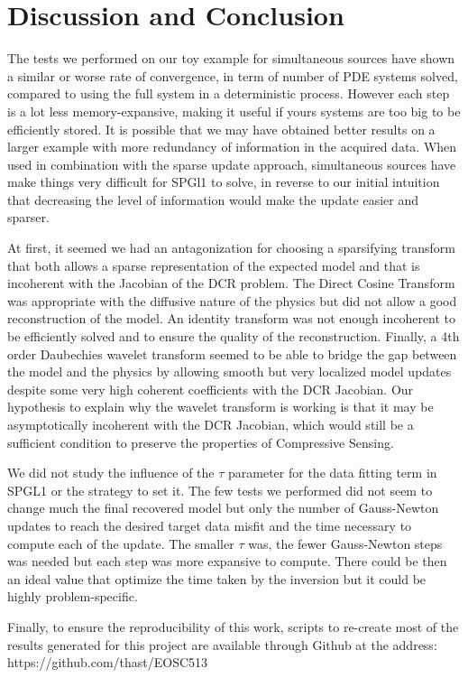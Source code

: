 \documentclass[twoside]{article}
\begin{document}
\section{Discussion and Conclusion}

The tests we performed on our toy example for simultaneous sources have shown a similar or worse rate of convergence, in term of number of PDE systems solved, compared to using the full system in a deterministic process. However each step is a lot less memory-expansive, making it useful if yours systems are too big to be efficiently stored. It is possible that we may have obtained better results on a larger example with more redundancy of information in the acquired data. When used in combination with the sparse update approach, simultaneous sources have make things very difficult for SPGl1 to solve, in reverse to our initial intuition that decreasing the level of information would make the update easier and sparser.

At first, it seemed we had an antagonization for choosing a sparsifying transform that both allows a sparse representation of the expected model and that is incoherent with the Jacobian of the DCR problem. The Direct Cosine Transform was appropriate with the diffusive nature of the physics but did not allow a good reconstruction of the model. An identity transform was not enough incoherent to be efficiently solved and to ensure the quality of the reconstruction. Finally, a 4th order Daubechies wavelet transform seemed to be able to bridge the gap between the model and the physics by allowing smooth but very localized model updates despite some very high coherent coefficients with the DCR Jacobian. Our hypothesis to explain why the wavelet transform is working is that it may be asymptotically incoherent with the DCR Jacobian, which would still be a sufficient condition to preserve the properties of Compressive Sensing.

We did not study the influence of the $\tau$ parameter for the data fitting term in SPGL1 or the strategy to set it. The few tests we performed did not seem to change much the final recovered model but only the number of Gauss-Newton updates to reach the desired target data misfit and the time necessary to compute each of the update. The smaller $\tau$ was, the fewer Gauss-Newton steps was needed but each step was more expansive to compute. There could be then an ideal value that optimize the time taken by the inversion but it could be highly problem-specific.

Finally, to ensure the reproducibility of this work, scripts to re-create most of the results generated for this project are available through Github at the address: https://github.com/thast/EOSC513
\end{document}
